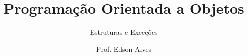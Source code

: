 \title{Programação Orientada a Objetos}
\subtitle{Estruturas e Exceções}
\date{}
\author{Prof. Edson Alves}
